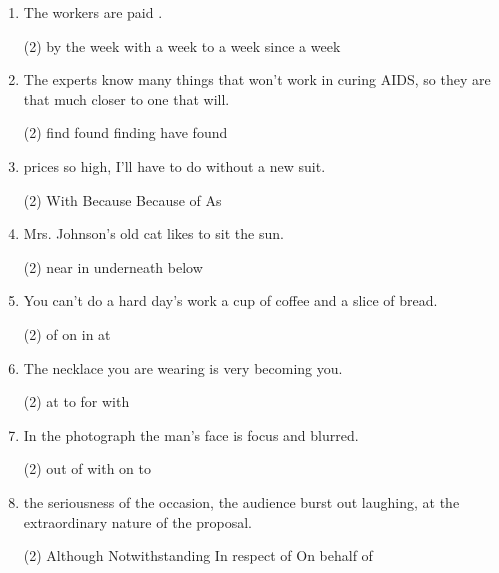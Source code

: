\begin{enumerate}
\item The workers are paid \ttu.
  \begin{tasks}(2)
    \task by the week
    \task with a week
    \task to a week
    \task since a week
  \end{tasks}

\item The experts know many things that won't work in curing AIDS, so they are that much closer to \ttu one that will.
  \begin{tasks}(2)
    \task find
    \task found
    \task finding
    \task have found
  \end{tasks}

\item \ttu prices so high, I'll have to do without a new suit.
  \begin{tasks}(2)
    \task With
    \task Because
    \task Because of
    \task As
  \end{tasks}

\item Mrs. Johnson's old cat likes to sit \ttu the sun.
  \begin{tasks}(2)
    \task near
    \task in
    \task underneath
    \task below
  \end{tasks}

\item You can't do a hard day's work \ttu a cup of coffee and a slice of bread.
  \begin{tasks}(2)
    \task of
    \task on
    \task in
    \task at
  \end{tasks}

\item The necklace you are wearing is very becoming \ttu you.
  \begin{tasks}(2)
    \task at
    \task to
    \task for
    \task with
  \end{tasks}

\item In the photograph the man's face is \ttu focus and blurred.
  \begin{tasks}(2)
    \task out of
    \task with
    \task on
    \task to
  \end{tasks}

\item \ttu the seriousness of the occasion, the audience burst out laughing, at the extraordinary nature of the proposal.
  \begin{tasks}(2)
    \task Although
    \task Notwithstanding
    \task In respect of
    \task On behalf of
  \end{tasks}


\end{enumerate}
